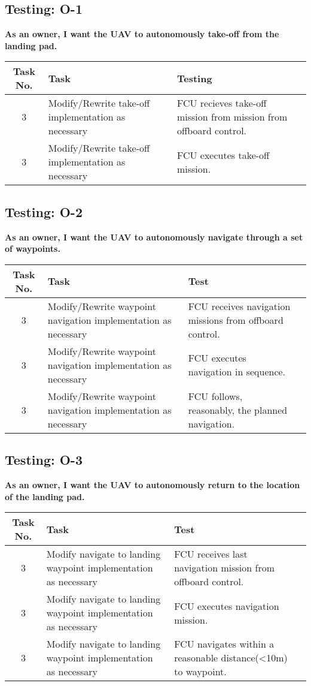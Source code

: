 \subsection{Testing: O-1}
\textbf{As an owner, I want the UAV to autonomously take-off from the landing pad.}\\
\begin{tabular}{| c | >{\raggedright}m{4cm} | m{4cm} | c |}\hline
	Task No. & Task & Testing\\\hline
	3 & Modify/Rewrite take-off implementation as necessary
 & FCU recieves take-off mission from mission from offboard control.\\\hline	
	3 & Modify/Rewrite take-off implementation as necessary
 & FCU executes take-off mission.\\\hline	
\end{tabular}

\subsection{Testing: O-2}
\textbf{As an owner, I want the UAV to autonomously navigate through a set of waypoints.}\\
\begin{tabular}{| c | >{\raggedright}m{4cm} | m{4cm} | c |}\hline
	Task No. & Task & Test\\\hline
	3 & Modify/Rewrite waypoint navigation implementation as necessary & FCU receives navigation missions from offboard control.\\\hline
	3 & Modify/Rewrite waypoint navigation implementation as necessary & FCU executes navigation in sequence.\\\hline
	3 & Modify/Rewrite waypoint navigation implementation as necessary & FCU follows, reasonably, the planned navigation.\\\hline
\end{tabular}

\subsection{Testing: O-3}
\textbf{As an owner, I want the UAV to autonomously return to the location of the landing pad.}\\
\begin{tabular}{| c | >{\raggedright}m{4cm} | m{4cm} | c |}\hline
	Task No. & Task & Test\\\hline
	3 & Modify navigate to landing waypoint implementation as necessary & FCU receives last navigation mission from offboard control.\\\hline
	3 & Modify navigate to landing waypoint implementation as necessary & FCU executes navigation mission.\\\hline
	3 & Modify navigate to landing waypoint implementation as necessary & FCU navigates within a reasonable distance(\textless 10m) to waypoint.\\\hline
\end{tabular}

